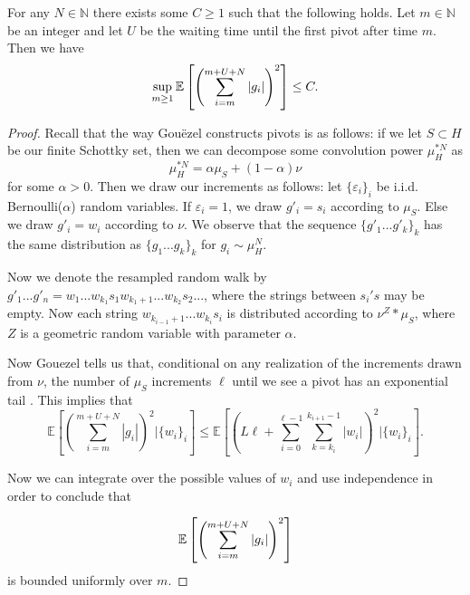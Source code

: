 \begin{lem}\label{lem: small values mn} For any $ N \in \mathbb{N} $ there exists some $ C \ge 1$ such that the following holds. Let $ m \in \mathbb{N} $ be an integer and let $ U $ be the waiting time until the first pivot after time $ m $. Then we have
	$$\sup_{m\ge 1}\mathbb{E}\left[\left( \sum_{i=m}^{m+U+N}|g_i| \right)^2\right]\le C.$$
\end{lem}
\begin{proof}
%	
	Recall that the way Gouëzel constructs pivots is as follows: if we let $ S \subset H$ be our finite Schottky set, then we can decompose some convolution power $ \mu _{H} ^{*N} $ as \[ \mu _{H} ^{*N} = \alpha \mu _{S} + (1-\alpha)\nu \] for some $ \alpha >0$. Then we draw our increments as follows: let $ \{ \varepsilon _{i} \} _{i} $ be i.i.d. Bernoulli($ \alpha $) random variables. If $ \varepsilon _{i} = 1 $, we draw $ g' _{i} = s _{i} $ according to $ \mu _{S} $. Else we draw $g' _{i} = w _{i} $ according to $ \nu $. We observe that the sequence $ \{ g '_{1}...g' _{k} \} _{k} $ has the same distribution as $ \{ g _{1}...g _{k} \} _{k} $ for $ g _{i} \sim \mu _{H} ^{N} $.
	
	Now we denote the resampled random walk by $ g' _{1}...g' _{n} =w _{1}...w _{k _{1}} s _{1} w _{k _{1} +1} ...w _{k _{2}} s _{2} ... $, where the strings between $ s _{i}'s $ may be empty. Now each string $ w _{k _{i-1} +1}...w _{k _{i}} s _{i}  $ is distributed according to $ \nu ^{Z}* \mu _{S} $, where $ Z $ is a geometric random variable with parameter $ \alpha $. 
	
	Now Gouezel tells us that, conditional on any realization of the increments drawn from $ \nu $, the number of $ \mu _{S} $ increments $ \ell $ until we see a pivot has an exponential tail \cite[Lemma 4.9]{Gouezel2022}. This implies that
	\[ \mathbb{E} \left[\left(\sum_{i = m}^{m+U+N} |g _{i}| \right) ^{2} | \{ w _{i} \}_i \right] \leq \mathbb{E} \left[\left(L\ell + \sum_{i = 0}^{\ell-1} \sum_{k = k_{i}}^{k_{i+1} -1} |w _{i}|\right) ^{2} | \{ w _{i} \} _{i} \right] .\] 
	
	Now we can integrate over the possible values of $ w _{i} $ and use independence in order to conclude that 
	
	\[ \mathbb{E}\left[\left( \sum_{i=m}^{m+U+N}|g_i| \right)^2\right] \] is bounded uniformly over $ m $.
\end{proof}

